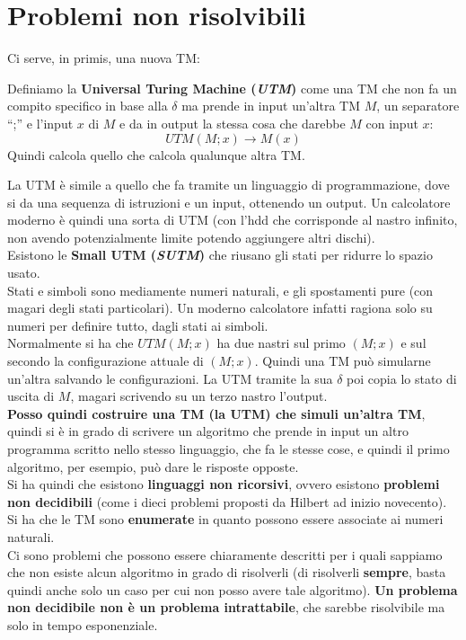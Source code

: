 \section{Problemi non risolvibili}
Ci serve, in primis, una nuova TM:
\begin{definizione}
  Definiamo la \textbf{Universal Turing Machine (\textit{UTM})} come una TM che
  non fa un compito specifico in base alla $\delta$ ma prende in input un'altra
  TM $M$, un separatore ``;'' e l'input $x$ di $M$ e da in output la stessa cosa
  che darebbe $M$ con input $x$:
  \[UTM(M;x)\to M(x)\]
  Quindi calcola quello che calcola qualunque altra TM.
\end{definizione}
La UTM è simile a quello che fa tramite un linguaggio di programmazione, dove si
da una sequenza di istruzioni e un input, ottenendo un output. Un calcolatore
moderno è quindi una sorta di UTM (con l'hdd che corrisponde al nastro
infinito, non avendo potenzialmente limite potendo aggiungere altri dischi).\\
Esistono le \textbf{Small UTM (\textit{SUTM})} che riusano gli stati per ridurre
lo spazio usato.\\
Stati e simboli sono mediamente numeri naturali, e gli spostamenti pure (con
magari degli stati particolari). Un moderno calcolatore infatti ragiona solo su
numeri per definire tutto, dagli stati ai simboli.\\
Normalmente si ha che $UTM(M;x)$ ha due nastri sul primo $(M;x)$ e sul secondo
la configurazione attuale di $(M;x)$. Quindi una TM può simularne un'altra
salvando le configurazioni. La UTM tramite la sua $\delta$ poi copia lo stato di
uscita di $M$, magari scrivendo su un terzo nastro l'output.\\
\textbf{Posso quindi costruire una TM (la UTM) che simuli un'altra TM}, quindi
si è in grado di scrivere un algoritmo che prende in input un altro programma
scritto nello stesso linguaggio, che fa le stesse cose, e quindi il primo
algoritmo, per esempio, può dare le risposte opposte.\\
Si ha quindi che esistono \textbf{linguaggi non ricorsivi}, ovvero esistono
\textbf{problemi non decidibili} (come i dieci problemi proposti da Hilbert ad
inizio novecento).\\
Si ha che le TM sono \textbf{enumerate} in quanto possono essere associate ai
numeri naturali.\\
Ci sono problemi che possono essere chiaramente descritti per i quali sappiamo
che non esiste alcun algoritmo in grado di risolverli (di risolverli
\textbf{sempre}, basta quindi anche solo un caso per cui non posso avere tale
algoritmo). \textbf{Un problema non decidibile non è un problema intrattabile},
che sarebbe risolvibile ma solo in tempo esponenziale.\\
